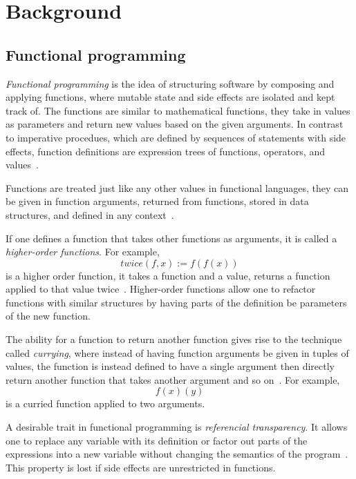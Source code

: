 \chapter{Background}\label{ch:background}

\section{Functional programming}

\emph{Functional programming} is the idea of structuring software by
composing and applying functions, where mutable state and side effects are
isolated and kept track of. The functions are similar to mathematical functions,
they take in values as parameters and return new values based on the given
arguments. In contrast to imperative procedues, which are defined by sequences
of statements with side effects, function definitions are expression trees of
functions, operators, and values~\cite{functional-Hudak, functional-Hughes}.

Functions are treated just like any other values in functional languages, they
can be given in function arguments, returned from functions, stored in data
structures, and defined in any context~\cite{functional-Hudak, sicp}.

If one defines a function that takes other functions as arguments, it is called
a \emph{higher-order functions}. For example,
\[ \mathit{twice}(f, x) := f(f(x)) \] is a higher order function, it takes a
function and a value, returns a function applied to that value
twice~\cite{functional-Hudak, lambda-Revesz}. Higher-order functions allow one
to refactor functions with similar structures by having parts of the definition
be parameters of the new function.

The ability for a function to return another function gives rise to the
technique called \emph{currying}, where instead of having function arguments be
given in tuples of values, the function is instead defined to have a single
argument then directly return another function that takes another argument and
so on~\cite{functional-Hudak, lambda-Revesz, lambda-Barendregt}. For example,
\[ f(x)(y) \] is a curried function applied to two arguments.

A desirable trait in functional programming is \emph{referencial transparency}.
It allows one to replace any variable with its definition or factor out parts of
the expressions into a new variable without changing the semantics of the
program~\cite{functional-Hudak, functional-Hughes}. This property is lost if
side effects are unrestricted in functions.

